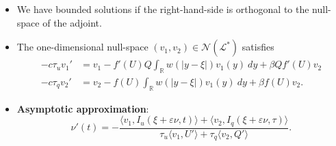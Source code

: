 \documentclass[landscape,final]{baposter}
\newcommand{\RR}{\mathbb{R}}
\newcommand{\LL}{\mathcal{L}}
\begin{document}
\begin{poster}
{\begin{itemize}
\begin{align*}
\begin{bmatrix}
  \beta Q f'(U) & \beta f(U)
		\end{bmatrix}
		\begin{bmatrix}\phi \\ \psi \end{bmatrix}
		\end{align*}
		\item We have bounded solutions if the right-hand-side is orthogonal to the null-space of the adjoint.
		\item The one-dimensional null-space $(v_1, v_2) \in \mathcal{N}(\LL^*)$ satisfies
		\begin{align*}
	    	-c \tau_u v_1' &= v_1 -f'(U)Q \int_\RR w(|y-\xi|) v_1(y) \ dy + \beta Q f'(U)v_2 \\
	    	-c \tau_q v_2' &= v_2 - f(U) \int_\RR w(|y-\xi|) v_1(y) \ dy + \beta f(U) v_2.
		\end{align*}
		\item \textbf{Asymptotic approximation}:
		 \[
	 		\nu'(t) = - \frac{\langle v_1, I_u(\xi+\varepsilon \nu, t) \rangle + \langle v_2,  I_q(\xi+\varepsilon \nu, \tau) \rangle}{\tau_u \langle v_1, U' \rangle + \tau_q \langle v_2, Q' \rangle}.
	 	\]
	\end{itemize}
	
	\vspace{.2cm}
}


\end{poster}
\end{document}
